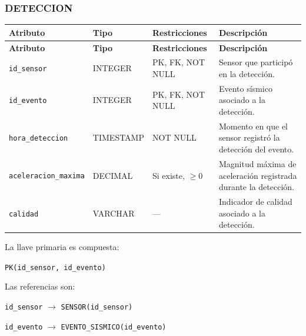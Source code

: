 \documentclass[12pt,a4paper]{article}
\begin{document}

\subsubsection*{DETECCION}

{
\small
\setlength{\tabcolsep}{3pt}
\renewcommand{\arraystretch}{1.15}

\begin{longtable}{
    >{\raggedright\arraybackslash}p{4.25cm}
    >{\raggedright\arraybackslash}p{2.65cm}
    >{\raggedright\arraybackslash}p{3.85cm}
    >{\raggedright\arraybackslash}p{3.85cm}
}
\toprule
\textbf{Atributo} &
\textbf{Tipo} &
\textbf{Restricciones} &
\textbf{Descripción} \\
\midrule
\endfirsthead

\toprule
\textbf{Atributo} &
\textbf{Tipo} &
\textbf{Restricciones} &
\textbf{Descripción} \\
\midrule
\endhead

\texttt{id\_\allowbreak{}sensor} &
INTEGER &
PK, FK, NOT NULL &
Sensor que participó en la detección. \\

\texttt{id\_\allowbreak{}evento} &
INTEGER &
PK, FK, NOT NULL &
Evento sísmico asociado a la detección. \\

\texttt{hora\_\allowbreak{}deteccion} &
TIMESTAMP &
NOT NULL &
Momento en que el sensor registró la detección del evento. \\

\texttt{aceleracion\_\allowbreak{}maxima} &
DECIMAL &
Si existe, $\geq 0$ &
Magnitud máxima de aceleración registrada durante la detección. \\

\texttt{calidad} &
VARCHAR &
--- &
Indicador de calidad asociado a la detección. \\

\bottomrule
\end{longtable}
}

La llave primaria es compuesta:

\noindent
\texttt{PK(id\_\allowbreak{}sensor, id\_\allowbreak{}evento)}

Las referencias son:

\noindent
\texttt{id\_\allowbreak{}sensor}
$\rightarrow$
\texttt{SENSOR(id\_\allowbreak{}sensor)}

\noindent
\texttt{id\_\allowbreak{}evento}
$\rightarrow$
\texttt{EVENTO\_\allowbreak{}SISMICO(id\_\allowbreak{}evento)}
\end{document}
